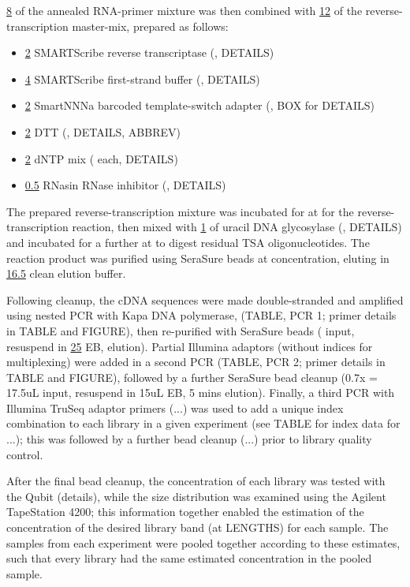 \ul{8} of the annealed RNA-primer mixture was then combined with \ul{12} of the reverse-transcription master-mix, prepared as follows:

\begin{itemize}
\item \ul{2} SMARTScribe reverse transcriptase (, DETAILS)
\item \ul{4} SMARTScribe first-strand buffer (, DETAILS)
\item \ul{2} SmartNNNa barcoded template-switch adapter (, BOX for DETAILS)
\item \ul{2} DTT (, DETAILS, ABBREV)
\item \ul{2} dNTP mix ( each, DETAILS)
\item \ul{0.5} RNasin RNase inhibitor (, DETAILS) 
\end{itemize}

The prepared reverse-transcription mixture was incubated for  at  for the reverse-transcription reaction, then mixed with \ul{1} of uracil DNA glycosylase (, DETAILS) and incubated for a further  at  to digest residual TSA oligonucleotides. The reaction product was purified using SeraSure beads at  concentration, eluting in \ul{16.5} clean elution buffer. %

Following cleanup, the cDNA sequences were made double-stranded and amplified using nested PCR with Kapa DNA polymerase, %
(TABLE, PCR 1; primer details in TABLE and FIGURE), then re-purified with SeraSure beads ( input, resuspend in \ul{25} EB,  elution). Partial Illumina adaptors (without indices for multiplexing) were added in a second PCR (TABLE, PCR 2; primer details in TABLE and FIGURE), followed by a further SeraSure bead cleanup (0.7x = 17.5uL input, resuspend in 15uL EB, 5 mins elution). Finally, a third PCR with Illumina TruSeq adaptor primers (...) was used to add a unique index combination to each library in a given experiment (see TABLE for index data for ...); this was followed by a further bead cleanup (...) prior to library quality control.

After the final bead cleanup, the concentration of each library was tested with the Qubit (details), while the size distribution was examined using the Agilent TapeStation 4200; this information together enabled the estimation of the concentration of the desired library band (at LENGTHS) for each sample. The samples from each experiment were pooled together according to these estimates, such that every library had the same estimated concentration in the pooled sample. 


